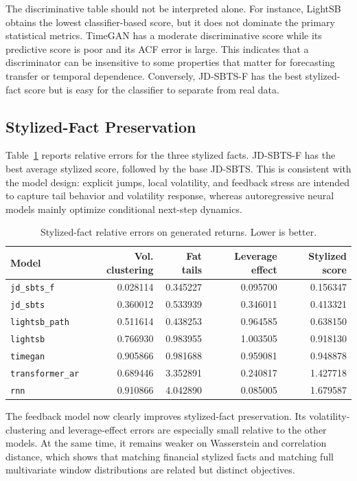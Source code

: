 \documentclass[11pt,a4paper]{article}
\begin{document}
The discriminative table should not be interpreted alone. For instance,
LightSB obtains the lowest classifier-based score, but it does not dominate the
primary statistical metrics. TimeGAN has a moderate discriminative score while
its predictive score is poor and its ACF error is large. This indicates that a
discriminator can be insensitive to some properties that matter for forecasting
transfer or temporal dependence. Conversely, JD-SBTS-F has the best
stylized-fact score but is easy for the classifier to separate from real data.

\subsection{Stylized-Fact Preservation}

Table~\ref{tab:stylized} reports relative errors for the three stylized facts.
JD-SBTS-F has the best average stylized score, followed by the base JD-SBTS.
This is consistent with the model design: explicit jumps, local volatility, and
feedback stress are intended to capture tail behavior and volatility response,
whereas autoregressive neural models mainly optimize conditional next-step
dynamics.

\begin{table}[H]
\centering
\caption{Stylized-fact relative errors on generated returns. Lower is better.}
\label{tab:stylized}
\begin{tabular}{lrrrr}
\toprule
Model & Vol. clustering & Fat tails & Leverage effect & Stylized score \\
\midrule
\texttt{jd\_sbts\_f} & 0.028114 & 0.345227 & 0.095700 & 0.156347 \\
\texttt{jd\_sbts} & 0.360012 & 0.533939 & 0.346011 & 0.413321 \\
\texttt{lightsb\_path} & 0.511614 & 0.438253 & 0.964585 & 0.638150 \\
\texttt{lightsb} & 0.766930 & 0.983955 & 1.003505 & 0.918130 \\
\texttt{timegan} & 0.905866 & 0.981688 & 0.959081 & 0.948878 \\
\texttt{transformer\_ar} & 0.689446 & 3.352891 & 0.240817 & 1.427718 \\
\texttt{rnn} & 0.910866 & 4.042890 & 0.085005 & 1.679587 \\
\bottomrule
\end{tabular}
\end{table}

The feedback model now clearly improves stylized-fact preservation. Its
volatility-clustering and leverage-effect errors are especially small relative
to the other models. At the same time, it remains weaker on Wasserstein and
correlation distance, which shows that matching financial stylized facts and
matching full multivariate window distributions are related but distinct
objectives.
\end{document}
